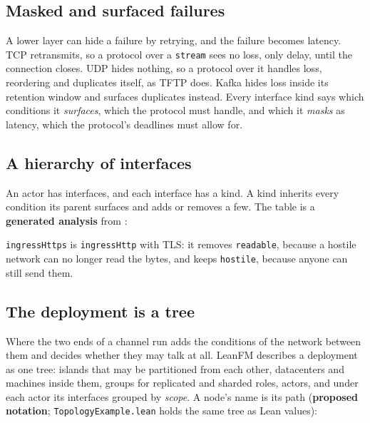 \subsection{Masked and surfaced failures}

A lower layer can hide a failure by retrying, and the failure becomes latency.
TCP retransmits, so a protocol over a \texttt{stream} sees no loss, only delay,
until the connection closes. UDP hides nothing, so a protocol over it handles
loss, reordering and duplicates itself, as TFTP does. Kafka hides loss inside
its retention window and surfaces duplicates instead. Every interface kind says
which conditions it \emph{surfaces}, which the protocol must handle, and which it
\emph{masks} as latency, which the protocol's deadlines must allow for.

\subsection{A hierarchy of interfaces}

An actor has interfaces, and each interface has a kind. A kind inherits every
condition its parent surfaces and adds or removes a few. The table is a
\textbf{generated analysis} from :

\begin{center}
\small

\end{center}

\texttt{ingressHttps} is \texttt{ingressHttp} with TLS: it removes
\texttt{readable}, because a hostile network can no longer read the bytes, and
keeps \texttt{hostile}, because anyone can still send them.

\subsection{The deployment is a tree}

Where the two ends of a channel run adds the conditions of the network between
them and decides whether they may talk at all. LeanFM describes a deployment as
one tree: islands that may be partitioned from each other, datacenters and
machines inside them, groups for replicated and sharded roles, actors, and under
each actor its interfaces grouped by \emph{scope}. A node's name is its path
(\textbf{proposed notation}; \texttt{TopologyExample.lean} holds the same tree
as Lean values):

